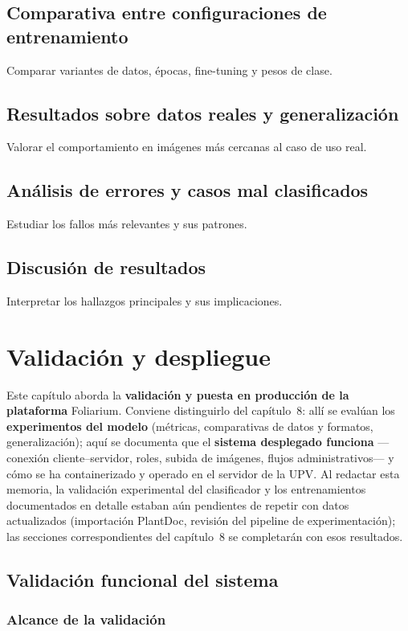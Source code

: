 \documentclass[11pt,spanish,listoffigures,listoftables]{tfgetsinf}
\begin{document}
\section{Comparativa entre configuraciones de entrenamiento}
Comparar variantes de datos, épocas, fine-tuning y pesos de clase.

\section{Resultados sobre datos reales y generalización}
Valorar el comportamiento en imágenes más cercanas al caso de uso real.

\section{Análisis de errores y casos mal clasificados}
Estudiar los fallos más relevantes y sus patrones.

\section{Discusión de resultados}
Interpretar los hallazgos principales y sus implicaciones.

\chapter{Validación y despliegue}

Este capítulo aborda la \textbf{validación y puesta en producción de la plataforma} Foliarium. Conviene distinguirlo del capítulo~8: allí se evalúan los \textbf{experimentos del modelo} (métricas, comparativas de datos y formatos, generalización); aquí se documenta que el \textbf{sistema desplegado funciona} ---conexión cliente--servidor, roles, subida de imágenes, flujos administrativos--- y cómo se ha containerizado y operado en el servidor de la UPV. Al redactar esta memoria, la validación experimental del clasificador y los entrenamientos documentados en detalle estaban aún pendientes de repetir con datos actualizados (importación PlantDoc, revisión del pipeline de experimentación); las secciones correspondientes del capítulo~8 se completarán con esos resultados.

\section{Validación funcional del sistema}

\subsection{Alcance de la validación}
\end{document}

